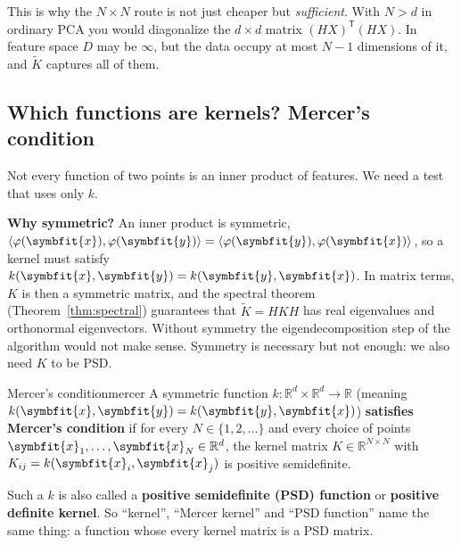 \documentclass[11pt]{article}
\newcommand{\bm}[1]{\symbfit{#1}}
\newcommand{\R}{\mathbb{R}}
\newcommand{\vx}{\bm{x}}
\newcommand{\vy}{\bm{y}}
\newcommand{\T}{^{\mathsf T}}
\begin{document}
\begin{intuition}
This is why the $N\times N$ route is not just cheaper but \emph{sufficient}. With $N>d$ in
ordinary PCA you would diagonalize the $d\times d$ matrix $(HX)\T(HX)$. In feature space
$D$ may be $\infty$, but the data occupy at most $N-1$ dimensions of it, and $\widetilde K$
captures all of them.
\end{intuition}

\subsection{Which functions are kernels? Mercer's condition}

Not every function of two points is an inner product of features. We need a test that uses
only $k$.

\textbf{Why symmetric?} An inner product is symmetric, $\langle\varphi(\vx),\varphi(\vy)\rangle=\langle\varphi(\vy),\varphi(\vx)\rangle$,
so a kernel must satisfy $k(\vx,\vy)=k(\vy,\vx)$. In matrix terms, $K$ is then a symmetric
matrix, and the spectral theorem (Theorem~\ref{thm:spectral}) guarantees that $\widetilde K=HKH$ has
real eigenvalues and orthonormal eigenvectors. Without symmetry the eigendecomposition step of
the algorithm would not make sense. Symmetry is necessary but not enough: we also need
$K$ to be PSD.

\begin{definition}{Mercer's condition}{mercer}
A symmetric function $k:\R^d\times\R^d\to\R$ (meaning $k(\vx,\vy)=k(\vy,\vx)$) \textbf{satisfies Mercer's
condition} if for every $N\in\{1,2,\dots\}$ and every choice of points $\vx_1,\dots,\vx_N\in\R^d$, the
kernel matrix $K\in\R^{N\times N}$ with $K_{ij}=k(\vx_i,\vx_j)$ is positive semidefinite.
\end{definition}
Such a $k$ is also called a \textbf{positive semidefinite (PSD) function} or
\textbf{positive definite kernel}. So ``kernel'', ``Mercer kernel'' and ``PSD function'' name the
same thing: a function whose every kernel matrix is a PSD matrix.
\end{document}
